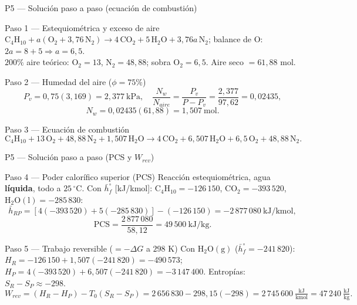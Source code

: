 \documentclass[aspectratio=169,10pt]{beamer}
\begin{document}
\begin{frame}{P5 --- Solución paso a paso (ecuación de combustión)}
\begin{cardgear}{Paso 1 --- Estequiométrica y exceso de aire}{\faSuperscript}
{\footnotesize
$\mathrm{C_4H_{10}}+a(\mathrm{O_2}+3{,}76\,\mathrm{N_2})\to4\,\mathrm{CO_2}+5\,\mathrm{H_2O}+3{,}76a\,\mathrm{N_2}$; balance de O: $2a=8+5\Rightarrow a=6{,}5$.\\[0.6mm]
$200\%$ aire teórico: $\mathrm{O_2}=13$, $\mathrm{N_2}=48{,}88$; sobra $\mathrm{O_2}=6{,}5$. Aire seco $=61{,}88$ mol.}
\end{cardgear}
\vspace{1mm}
\begin{cardidea}{Paso 2 --- Humedad del aire ($\phi=75\%$)}{\faTint}
$$P_v=0{,}75(3{,}169)=2{,}377\ \text{kPa},\quad \frac{N_w}{N_{aire}}=\frac{P_v}{P-P_v}=\frac{2{,}377}{97{,}62}=0{,}02435,$$
$$N_w=0{,}02435(61{,}88)=1{,}507\ \text{mol}.$$
\end{cardidea}
\vspace{1mm}
\begin{cardgear}{Paso 3 --- Ecuación de combustión}{\faListOl}
{\footnotesize
$$\mathrm{C_4H_{10}}+13\,\mathrm{O_2}+48{,}88\,\mathrm{N_2}+1{,}507\,\mathrm{H_2O}\to4\,\mathrm{CO_2}+6{,}507\,\mathrm{H_2O}+6{,}5\,\mathrm{O_2}+48{,}88\,\mathrm{N_2}.$$}
\end{cardgear}
\end{frame}

\begin{frame}{P5 --- Solución paso a paso (PCS y $W_{rev}$)}
\begin{cardidea}{Paso 4 --- Poder calorífico superior (PCS)}{\faFire}
{\footnotesize
Reacción estequiométrica, agua \textbf{líquida}, todo a $25\,^\circ$C. Con $\bar h_f^\circ$ [kJ/kmol]: $\mathrm{C_4H_{10}}=-126\,150$, $\mathrm{CO_2}=-393\,520$, $\mathrm{H_2O(l)}=-285\,830$:
$$\bar h_{RP}=[4(-393\,520)+5(-285\,830)]-(-126\,150)=-2\,877\,080\ \text{kJ/kmol},$$
$$\mathrm{PCS}=\frac{2\,877\,080}{58{,}12}=49\,500\ \text{kJ/kg}.$$}
\end{cardidea}
\vspace{0.8mm}
\begin{cardgear}{Paso 5 --- Trabajo reversible ($=-\Delta G$ a $298$ K)}{\faSuperscript}
{\footnotesize
Con $\mathrm{H_2O(g)}$ ($\bar h_f^\circ=-241\,820$): $H_R=-126\,150+1{,}507(-241\,820)=-490\,573$; $H_P=4(-393\,520)+6{,}507(-241\,820)=-3\,147\,400$. Entropías: $S_R-S_P\approx-298$.
$$W_{rev}=(H_R-H_P)-T_0(S_R-S_P)=2\,656\,830-298{,}15(-298)=2\,745\,600\ \tfrac{\text{kJ}}{\text{kmol}}=47\,240\ \tfrac{\text{kJ}}{\text{kg}}.$$}
\end{cardgear}
\end{frame}
\end{document}
